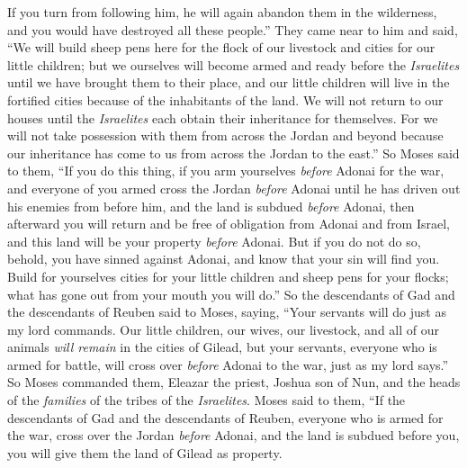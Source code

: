\begin{biblechapter}
\verse If you turn from following him, he will again abandon them in the wilderness, and you would have destroyed all these people.”
\verse They came near to him and said, “We will build sheep pens here for the flock of our livestock and cities for our little children;
\verse but we ourselves will become armed and ready before the \textit{Israelites} until we have brought them to their place, and our little children will live in the fortified cities because of the inhabitants of the land.
\verse We will not return to our houses until the \textit{Israelites} each obtain their inheritance for themselves.
\verse For we will not take possession with them from across the Jordan and beyond because our inheritance has come to us from across the Jordan to the east.”
\verse So Moses said to them, “If you do this thing, if you arm yourselves \textit{before} Adonai for the war,
\verse and everyone of you armed cross the Jordan \textit{before} Adonai until he has driven out his enemies from before him,
\verse and the land is subdued \textit{before} Adonai, then afterward you will return and be free of obligation from Adonai and from Israel, and this land will be your property \textit{before} Adonai.
\verse But if you do not do so, behold, you have sinned against Adonai, and know that your sin will find you.
\verse Build for yourselves cities for your little children and sheep pens for your flocks; what has gone out from your mouth you will do.”
\verse So the descendants of Gad and the descendants of Reuben said to Moses, saying, “Your servants will do just as my lord commands.
\verse Our little children, our wives, our livestock, and all of our animals \textit{will remain} in the cities of Gilead,
\verse but your servants, everyone who is armed for battle, will cross over \textit{before} Adonai to the war, just as my lord says.”
\verse So Moses commanded them, Eleazar the priest, Joshua son of Nun, and the heads of the \textit{families} of the tribes of the \textit{Israelites}.
\verse Moses said to them, “If the descendants of Gad and the descendants of Reuben, everyone who is armed for the war, cross over the Jordan \textit{before} Adonai, and the land is subdued before you, you will give them the land of Gilead as property.

\end{biblechapter}
